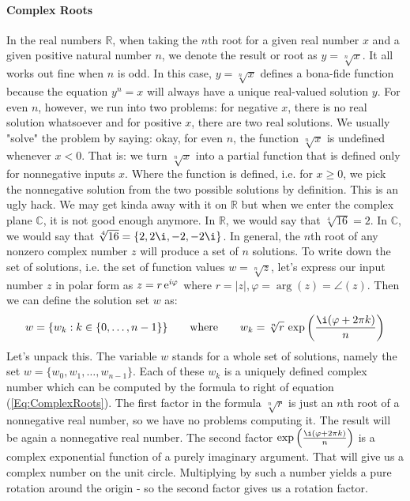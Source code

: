\paragraph{Complex Roots}
In the real numbers $\mathbb{R}$, when taking the $n$th root for a given real number $x$ and a given positive natural number $n$, we denote the result or root as $y = \sqrt[n]{x}$. It all works out fine when $n$ is odd. In this case, $y = \sqrt[n]{x}$ defines a bona-fide function because the equation $y^n = x$ will always have a unique real-valued solution $y$. For even $n$, however, we run into two problems: for negative $x$, there is no real solution whatsoever and for positive $x$, there are two real solutions. We usually "solve" the problem by saying: okay, for even $n$, the function $\sqrt[n]{x}$ is undefined whenever $x < 0$. That is: we turn $\sqrt[n]{x}$ into a partial function that is defined only for nonnegative inputs $x$. Where the function is defined, i.e. for $x \geq 0$, we pick the nonnegative solution from the two possible solutions by definition. This is an ugly hack. We may get kinda away with it on $\mathbb{R}$ but when we enter the complex plane $\mathbb{C}$, it is not good enough anymore. In $\mathbb{R}$, we would say that $\sqrt[4]{16} = 2$. In $\mathbb{C}$, we would say that $\sqrt[4]{16} = \{2,2\i,-2,-2\i\}$. In general, the $n$th root of any nonzero complex number $z$ will produce a set of $n$ solutions. To write down the set of solutions, i.e. the set of function values $w = \sqrt[n]{z}$, let's express our input number $z$ in polar form as $z = r \operatorname{\mathrm{e}}^{i \varphi}$ where $r = |z|, \varphi = \arg(z) = \angle(z)$. Then we can define the solution set $w$ as:
\begin{equation}
 \label{Eq:ComplexRoots}
 w = \{ w_k : k \in \{0,\ldots,n-1\} \}
 \qquad \text{where} \qquad
 w_k = \sqrt[n]{r} \, \exp \left( \frac{\i (\varphi + 2 \pi k) }{n} \right)
\end{equation}
Let's unpack this. The variable $w$ stands for a whole set of solutions, namely the set $w = \{w_0, w_1, \ldots, w_{n-1}\}$. Each of these $w_k$ is a uniquely defined complex number which can be computed by the formula to right of equation (\ref{Eq:ComplexRoots}). The first factor in the formula $\sqrt[n]{r}$ is just an $n$th root of a nonnegative real number, so we have no problems computing it. The result will be again a nonnegative real number. The second factor $\exp \left( \frac{\i (\varphi + 2 \pi k) }{n} \right)$ is a complex exponential function of a purely imaginary argument. That will give us a complex number on the unit circle. Multiplying by such a number yields a pure rotation around the origin - so the second factor gives us a rotation factor. 

